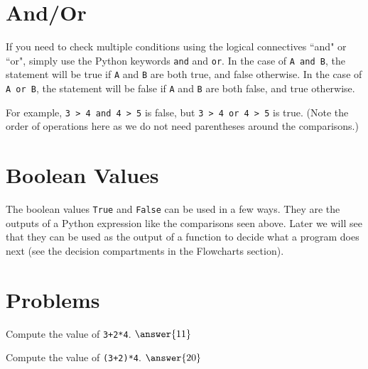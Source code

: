 \documentclass{ximera}
\begin{document}
\section{And/Or}

If you need to check multiple conditions using the logical connectives ``and" or ``or", simply use the Python keywords \verb|and| and \verb|or|. In the case of \verb|A and B|, the statement will be true if \verb|A| and \verb|B| are both true, and false otherwise. In the case of \verb|A or B|, the statement will be false if \verb|A| and \verb|B| are both false, and true otherwise.

For example, \verb|3 > 4 and 4 > 5| is false, but \verb|3 > 4 or 4 > 5| is true. (Note the order of operations here as we do not need parentheses around the comparisons.)

\section{Boolean Values}

The boolean values \verb|True| and \verb|False| can be used in a few ways. They are the outputs of a Python expression like the comparisons seen above. Later we will see that they can be used as the output of a function to decide what a program does next (see the decision compartments in the Flowcharts section).





\section{Problems}

\begin{question}
	Compute the value of \verb|3+2*4|. $\answer{11}$
\end{question}

\begin{question}
	Compute the value of \verb|(3+2)*4|. $\answer{20}$
\end{question}
\end{document}
